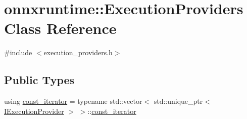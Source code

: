 \hypertarget{classonnxruntime_1_1ExecutionProviders}{}\section{onnxruntime\+:\+:Execution\+Providers Class Reference}
\label{classonnxruntime_1_1ExecutionProviders}


{\ttfamily \#include $<$execution\+\_\+providers.\+h$>$}

\subsection*{Public Types}
\begin{DoxyCompactItemize}
\item 
using \mbox{\hyperlink{classonnxruntime_1_1ExecutionProviders_a2eb06c44e805e428aa26b1bfe12348fb}{const\+\_\+iterator}} = typename std\+::vector$<$ std\+::unique\+\_\+ptr$<$ \mbox{\hyperlink{classonnxruntime_1_1IExecutionProvider}{I\+Execution\+Provider}} $>$ $>$\+::\mbox{\hyperlink{classonnxruntime_1_1ExecutionProviders_a2eb06c44e805e428aa26b1bfe12348fb}{const\+\_\+iterator}}
\end{DoxyCompactItemize}

